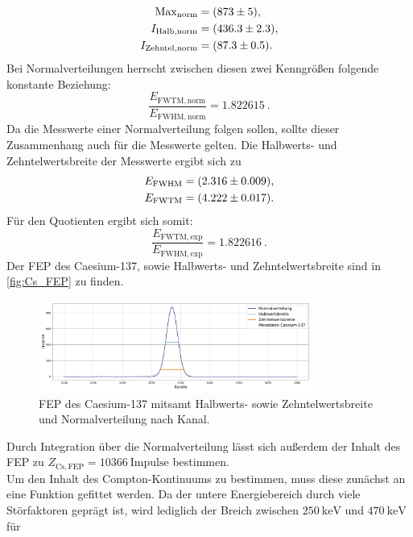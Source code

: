 \begin{align}
    \mathrm{Max}_{\mathrm{norm}}    &= \qty{873 \pm 5}{},\\
    I_{\mathrm{Halb, norm}}         &= \qty{436.3 \pm 2.3}{},\\
    I_{\mathrm{Zehntel, norm}}      &= \qty{87.3 \pm 0.5}{}.
\end{align}
Bei Normalverteilungen herrscht zwischen diesen zwei Kenngrößen folgende konstante Beziehung:
\begin{equation}
    \frac{E_{\mathrm{FWTM, norm}}}{E_{\mathrm{FWHM, norm}}} = \qty{1.822615}{}.
\end{equation}
Da die Messwerte einer Normalverteilung folgen sollen, sollte dieser Zusammenhang auch für die Messwerte gelten. Die Halbwerts- und Zehntelwertsbreite der Messwerte ergibt sich zu 
\begin{align}
    E_{\mathrm{FWHM}}    &= \qty{2.316 \pm 0.009}{},\\
    E_{\mathrm{FWTM}}     &= \qty{4.222 \pm 0.017}{}.
\end{align}
Für den Quotienten ergibt sich somit:
\begin{equation}
    \frac{E_{\mathrm{FWTM, exp}}}{E_{\mathrm{FWHM, exp}}} = \qty{1.822616}{}.
\end{equation}
Der FEP des Caesium-137, sowie Halbwerts- und Zehntelwertsbreite sind in \autoref{fig:Cs_FEP} zu finden.\\
\begin{figure}
    \centering
    \includegraphics[width = 0.8\textwidth]{plots/caesium_channel_gauss_fit.pdf}
    \caption{FEP des Caesium-137 mitsamt Halbwerts- sowie Zehntelwertsbreite und Normalverteilung nach Kanal.}
    \label{fig:Cs_FEP}
\end{figure}
Durch Integration über die Normalverteilung lässt sich außerdem der Inhalt des FEP zu $Z_{\mathrm{Cs, FEP}} = \qty{10366}{\mathrm{Impulse}}$ bestimmen.\\
Um den Inhalt des Compton-Kontinuums zu bestimmen, muss diese zunächst an eine Funktion gefittet werden. Da der untere Energiebereich durch
viele Störfaktoren geprägt ist, wird lediglich der Breich zwischen $\qty{250}{\kilo\electronvolt}$ und $\qty{470}{\kilo\electronvolt}$ für
